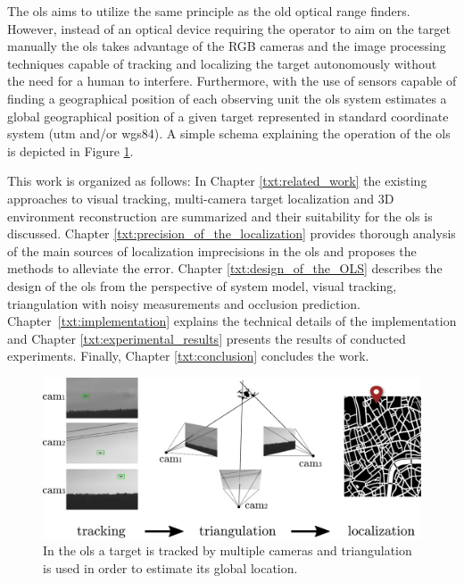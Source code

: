 The \gls{ols} aims to utilize the same principle as the old optical range finders. However, instead of an optical device requiring the operator to aim on the target manually the \gls{ols} takes advantage of the RGB cameras and the image processing techniques capable of tracking and localizing the target autonomously without the need for a human to interfere. Furthermore, with the use of sensors capable of finding a geographical position of each observing unit the \gls{ols} system estimates a global geographical position of a given target represented in standard coordinate system (\gls{utm} and/or \gls{wgs84}). A simple schema explaining the operation of the \gls{ols} is depicted in Figure \ref{fig:ols_principle}.

This work is organized as follows: In Chapter \ref{txt:related_work} the existing approaches to visual tracking, multi-camera target localization and 3D environment reconstruction are summarized and their suitability for the \gls{ols} is discussed. Chapter \ref{txt:precision_of_the_localization} provides thorough analysis of the main sources of localization imprecisions in the \gls{ols} and proposes the methods to alleviate the error. Chapter \ref{txt:design_of_the_OLS} describes the design of the \gls{ols} from the perspective of system model, visual tracking, triangulation with noisy measurements and occlusion prediction. Chapter~\ref{txt:implementation} explains the technical details of the implementation and Chapter \ref{txt:experimental_results} presents the results of conducted experiments. Finally, Chapter \ref{txt:conclusion} concludes the work.

\begin{figure}[htb]\centering
	\centering
	\includegraphics[width=0.8\linewidth]{fig/ols_principle.pdf}
	\caption{In the \gls{ols} a target is tracked by multiple cameras and triangulation is used in order to estimate its global location.}
	\label{fig:ols_principle}
\end{figure}

